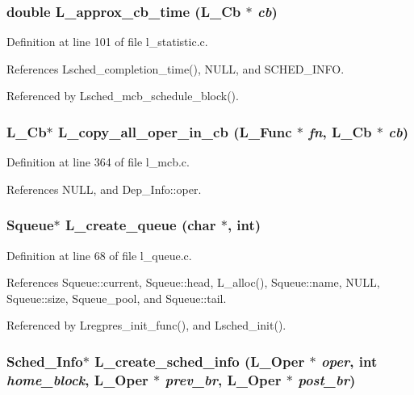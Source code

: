 \subsubsection{\setlength{\rightskip}{0pt plus 5cm}double L\_\-approx\_\-cb\_\-time (L\_\-Cb $\ast$ {\em cb})}\label{l__schedule_8h_a94cf304bcc32ebd982fa08332a51ae5}




Definition at line 101 of file l\_\-statistic.c.

References Lsched\_\-completion\_\-time(), NULL, and SCHED\_\-INFO.

Referenced by Lsched\_\-mcb\_\-schedule\_\-block().
\subsubsection{\setlength{\rightskip}{0pt plus 5cm}L\_\-Cb$\ast$ L\_\-copy\_\-all\_\-oper\_\-in\_\-cb (L\_\-Func $\ast$ {\em fn}, L\_\-Cb $\ast$ {\em cb})}\label{l__schedule_8h_d7ea649eb15d34bb940fea7fc01f55cf}




Definition at line 364 of file l\_\-mcb.c.

References NULL, and Dep\_\-Info::oper.
\subsubsection{\setlength{\rightskip}{0pt plus 5cm}\bf{Squeue}$\ast$ L\_\-create\_\-queue (char $\ast$, int)}\label{l__schedule_8h_5d4e806c6e14e8c8fbb00bfe7132373b}




Definition at line 68 of file l\_\-queue.c.

References Squeue::current, Squeue::head, L\_\-alloc(), Squeue::name, NULL, Squeue::size, Squeue\_\-pool, and Squeue::tail.

Referenced by Lregpres\_\-init\_\-func(), and Lsched\_\-init().
\subsubsection{\setlength{\rightskip}{0pt plus 5cm}\bf{Sched\_\-Info}$\ast$ L\_\-create\_\-sched\_\-info (L\_\-Oper $\ast$ {\em oper}, int {\em home\_\-block}, L\_\-Oper $\ast$ {\em prev\_\-br}, L\_\-Oper $\ast$ {\em post\_\-br})}\label{l__schedule_8h_268dd685af46604df42953774a82cca3}




